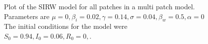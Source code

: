 \documentclass[12pt]{article}\usepackage[]{graphicx}\usepackage[]{color}
\makeatletter
\newenvironment{kframe}{%
 \def\at@end@of@kframe{}%
 \ifinner\ifhmode%
  \def\at@end@of@kframe{\end{minipage}}%
  \begin{minipage}{\columnwidth}%
 \fi\fi%
 \def\FrameCommand##1{\hskip\@totalleftmargin \hskip-\fboxsep
 \colorbox{shadecolor}{##1}\hskip-\fboxsep
     \hskip-\linewidth \hskip-\@totalleftmargin \hskip\columnwidth}%
 \MakeFramed {\advance\hsize-\width
   \@totalleftmargin\z@ \linewidth\hsize
   \@setminipage}}%
 {\par\unskip\endMakeFramed%
 \at@end@of@kframe}
\newenvironment{knitrout}{}{} %
\makeatother
\begin{document}
\begin{knitrout}
\color{fgcolor}















































\begin{kframe}

{\ttfamily\noindent\color{warningcolor}{\#\# Warning in plot.window(...): relative range of values =\ \ 98 * EPS, is small (axis 2)}}\end{kframe}

\begin{figure}
\caption{\label{fig:multipatch} Plot of the SIRW model for all patches in a multi patch model. Parameters are $\mu=0,\beta_i=0.02,\gamma=0.14,\sigma=0.04,\beta_w=0.5,\alpha=0$ The initial conditions for the model were $S_0=0.94,I_0=0.06,R_0=0,$.}\label{fig:<multiPatch}
\end{figure}


\end{knitrout}
\FloatBarrier

\end{document}
